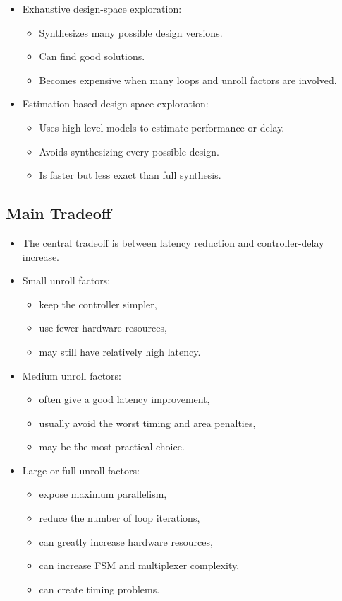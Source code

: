 \documentclass[conference]{IEEEtran}
\begin{document}
\begin{itemize}
    \item Exhaustive design-space exploration:
    \begin{itemize}
        \item Synthesizes many possible design versions.
        \item Can find good solutions.
        \item Becomes expensive when many loops and unroll factors are involved.
    \end{itemize}

    \item Estimation-based design-space exploration:
    \begin{itemize}
        \item Uses high-level models to estimate performance or delay.
        \item Avoids synthesizing every possible design.
        \item Is faster but less exact than full synthesis.
    \end{itemize}
\end{itemize}

\subsection{Main Tradeoff}

\begin{itemize}
    \item The central tradeoff is between latency reduction and controller-delay increase.
    \item Small unroll factors:
    \begin{itemize}
        \item keep the controller simpler,
        \item use fewer hardware resources,
        \item may still have relatively high latency.
    \end{itemize}

    \item Medium unroll factors:
    \begin{itemize}
        \item often give a good latency improvement,
        \item usually avoid the worst timing and area penalties,
        \item may be the most practical choice.
    \end{itemize}

    \item Large or full unroll factors:
    \begin{itemize}
        \item expose maximum parallelism,
        \item reduce the number of loop iterations,
        \item can greatly increase hardware resources,
        \item can increase FSM and multiplexer complexity,
        \item can create timing problems.
    \end{itemize}
\end{itemize}
\end{document}
